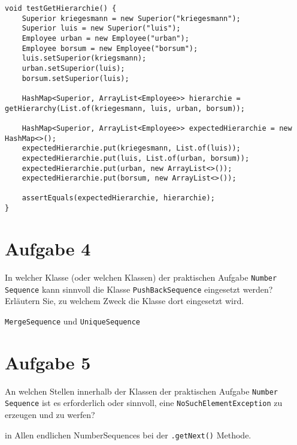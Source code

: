\begin{lstlisting}
void testGetHierarchie() {
    Superior kriegesmann = new Superior("kriegesmann");
    Superior luis = new Superior("luis");
    Employee urban = new Employee("urban");
    Employee borsum = new Employee("borsum");
    luis.setSuperior(kriegsmann);
    urban.setSuperior(luis);
    borsum.setSuperior(luis);

    HashMap<Superior, ArrayList<Employee>> hierarchie = getHierarchy(List.of(kriegesmann, luis, urban, borsum));
    
    HashMap<Superior, ArrayList<Employee>> expectedHierarchie = new HashMap<>();
    expectedHierarchie.put(kriegesmann, List.of(luis));
    expectedHierarchie.put(luis, List.of(urban, borsum));
    expectedHierarchie.put(urban, new ArrayList<>());
    expectedHierarchie.put(borsum, new ArrayList<>());

    assertEquals(expectedHierarchie, hierarchie);
}
\end{lstlisting}

\section{Aufgabe 4}
In welcher Klasse (oder welchen Klassen) der praktischen Aufgabe \lstinline{Number Sequence} kann sinnvoll die Klasse \lstinline{PushBackSequence} eingesetzt werden? Erläutern
Sie, zu welchem Zweck die Klasse dort eingesetzt wir{d.}

\lstinline{MergeSequence} und \lstinline{UniqueSequence}

\section{Aufgabe 5}
An welchen Stellen innerhalb der Klassen der praktischen Aufgabe \lstinline{Number Sequence} ist es erforderlich oder sinnvoll, eine \lstinline{NoSuchElementException} zu
erzeugen und zu werfen?

in Allen endlichen NumberSequences bei der \lstinline{.getNext()} Methode.